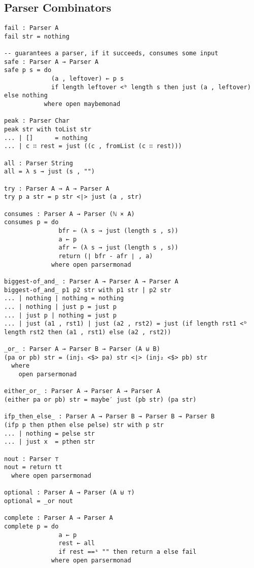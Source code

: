 \begin{appendices}
\section{Parser Combinators}
\label{appendix-parsercombinators}

\begin{verbatim}
fail : Parser A
fail str = nothing

-- guarantees a parser, if it succeeds, consumes some input
safe : Parser A → Parser A
safe p s = do
             (a , leftover) ← p s
             if length leftover <ᵇ length s then just (a , leftover) else nothing
           where open maybemonad

peak : Parser Char
peak str with toList str
... | []      = nothing
... | c ∷ rest = just ((c , fromList (c ∷ rest)))

all : Parser String
all = λ s → just (s , "")

try : Parser A → A → Parser A
try p a str = p str <∣> just (a , str)

consumes : Parser A → Parser (ℕ × A)
consumes p = do
               bfr ← (λ s → just (length s , s))
               a ← p
               afr ← (λ s → just (length s , s))
               return (∣ bfr - afr ∣ , a)
             where open parsermonad

biggest-of_and_ : Parser A → Parser A → Parser A
biggest-of_and_ p1 p2 str with p1 str | p2 str
... | nothing | nothing = nothing
... | nothing | just p = just p
... | just p | nothing = just p
... | just (a1 , rst1) | just (a2 , rst2) = just (if length rst1 <ᵇ length rst2 then (a1 , rst1) else (a2 , rst2))

_or_ : Parser A → Parser B → Parser (A ⊎ B)
(pa or pb) str = (inj₁ <$> pa) str <∣> (inj₂ <$> pb) str
  where
    open parsermonad

either_or_ : Parser A → Parser A → Parser A
(either pa or pb) str = maybe′ just (pb str) (pa str)

ifp_then_else_ : Parser A → Parser B → Parser B → Parser B
(ifp p then pthen else pelse) str with p str
... | nothing = pelse str
... | just x  = pthen str

nout : Parser ⊤
nout = return tt
  where open parsermonad

optional : Parser A → Parser (A ⊎ ⊤)
optional = _or nout

complete : Parser A → Parser A
complete p = do
               a ← p
               rest ← all
               if rest ==ˢ "" then return a else fail
             where open parsermonad


\end{verbatim}
\end{appendices}
